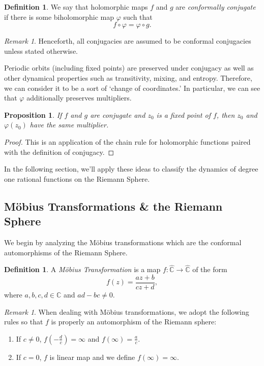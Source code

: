 \documentclass{amsart}
\newcommand{\bbC}{\mathbb{C}}
\newcommand{\bbCS}{\hat{\bbC}}
\renewcommand{\phi}{\varphi}
\newtheorem{prop}[thm]{Proposition}
\theoremstyle{definition}
\newtheorem{defn}[thm]{Definition}
\theoremstyle{remark}
\newtheorem{rem}[thm]{Remark}
\numberwithin{equation}{section}
\begin{document}
\begin{defn}
  We say that holomorphic maps $f$ and $g$ are \emph{conformally conjugate} if there is some biholomorphic map $\phi$ such that
  \begin{equation}
    f\circ \phi =\phi \circ g.
  \end{equation}
\end{defn}
\begin{rem}
  Henceforth, all conjugacies are assumed to be conformal conjugacies unless stated otherwise.
\end{rem}
Periodic orbits (including fixed points) are preserved under conjugacy as well as other dynamical properties such as transitivity, mixing, and entropy. Therefore, we can consider it to be a sort of `change of coordinates.' In particular, we can see that $\phi$ additionally preserves multipliers.
\begin{prop}
  If $f$ and $g$ are conjugate and $z_0$ is a fixed point of $f$, then $z_0$ and $\phi(z_0)$ have the same multiplier.
\end{prop}
\begin{proof}
  This is an application of the chain rule for holomorphic functions paired with the definition of conjugacy.
\end{proof}
In the following section, we'll apply these ideas to classify the dynamics of degree one rational functions on the Riemann Sphere.

\subsection{M\"{o}bius Transformations \& the Riemann Sphere}
  We begin by analyzing the M\"{o}bius transformations which are the conformal automorphisms of the Riemann Sphere. %

  \begin{defn}
    A \emph{M\"{o}bius Transformation} is a map $f\colon
  \bbCS\to\bbCS$ of the form
    \begin{equation}
      f(z)=\frac{az+b}{cz+d},
    \end{equation}
    where $a,b,c,d\in\bbC$ and $ad-bc\neq 0$.
  \end{defn}
  \begin{rem}
  When dealing with M\"obius transformations, we adopt the following rules so that $f$ is properly an automorphism of the Riemann sphere:
  \begin{enumerate}
    \item If $c\neq 0$, $f(-\frac{d}{c})=\infty$  and $f(\infty)=\frac{a}{c}$.
    \item If $c=0$, $f$ is linear map and we define $f(\infty)=\infty$.
  \end{enumerate}
  \end{rem}
\end{document}
